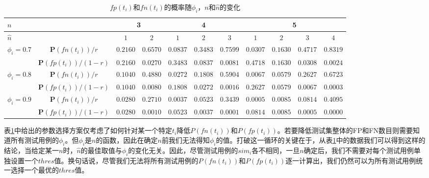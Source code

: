 \begin{landscape}
	
\begin{table}
	\centering
	\caption{$fp(t_i)$和$fn(t_i)$的概率随$\phi_i$，$n$和$\hat{n}$的变化}
	\label{tab:calculate fp fn}
	\begin{tabular}{c|c|cc|ccc|cccc}
		\hline
		\multicolumn{2}{l}{$n$} \vline& \multicolumn{2}{c}{3}  \vline & \multicolumn{3}{c}{4} \vline & \multicolumn{4}{c}{5} \\ \hline \multicolumn{2}{l}{$\hat{n}$} \vline &   $1$    &   $2$    &   $1$    &   $2$    &   $3$    &   $1$    &   $2$    &   $3$    &   $4$    \\ \hline
		$\phi_i = 0.7$        & $\mathbf{P}(fn(t_i)) / r$ & \color{red}$0.2160$ & $0.6570$ &$0.0837$ &  \color{red} $0.3483$ & $0.7599$ & $0.0307$ & \color{red}$0.1630$ & $0.4717$ & $0.8319$ \\  \cline{2-11}
		& $\mathbf{P}(fp(t_i)) / (1 - r)$ & \color{red}$0.2160$ & $0.0270$ & $0.3483$ & \color{red}$0.0837$ & $0.0081$ & $0.4718$ & \color{red}$0.1630$ & $0.0308$ & $0.0024$ \\ \hline
		
		$\phi_i = 0.8$        & $\mathbf{P}(fn(t_i)) / r$ & \color{red}$0.1040$ & $0.4880$ &$0.0272$ &  \color{red}$0.1808$ & $0.5904$ & $0.0067$ & \color{red}$0.0579$ & $0.2627$ & $0.6723$ \\  \cline{2-11}
		& $\mathbf{P}(fp(t_i)) / (1 - r)$ & \color{red}$0.1040$ & $0.0080$ & $0.1808$ & \color{red}$0.0272$ & $0.0016$ & $0.2627$ & \color{red}$0.0579$ & $0.0067$ & $0.0003$ \\ \hline
		
		$\phi_i = 0.9$        & $\mathbf{P}(fn(t_i)) / r$ & \color{red}$0.0280$ & $0.2710$ & $0.0037$ & \color{red}$0.0523$ & $0.3439$ & $0.0005$ & \color{red}$0.0085$ & $0.0814$ & $0.4095$ \\  \cline{2-11}
		& $\mathbf{P}(fp(t_i)) / (1 - r)$ & \color{red}$0.0280$ & $0.0010$ & $0.0523$ & \color{red}$0.0037$ & $0.0001$ & $0.0814$ & \color{red}$0.0085$ & $0.0005$ & $0.0000$ \\ \hline
		
		
	\end{tabular}
	
\end{table}
\end{landscape}
表\ref{tab:calculate fp fn}中给出的参数选择方案仅考虑了如何针对某一个特定$t_i$降低$P(fn(t_i))$和$P(fp(t_i))$。若要降低测试集整体的FP和FN数目则需要知道所有测试用例的$\phi_i$。但$\phi_i$是$n$的函数，因此在确定$n$前我们无法得知$\phi_i$的值。打破这一循环的关键在于，从表\ref{tab:calculate fp fn}中的数据我们可以得到这样的结论，当给定某一$n$时，$\hat{n}$的最佳取值与$\phi_i$的变化无关。因此，尽管测试用例的${sim}_i$各不相同，一旦$n$确定后，我们不需要对每个测试用例单独设置一个$thres$值。换句话说，尽管我们无法将所有测试用例的$P(fn(t_i))$和$P(fp(t_i))$逐一计算出，我们仍然可以为所有测试用例统一选择一个最优的$thres$值。

